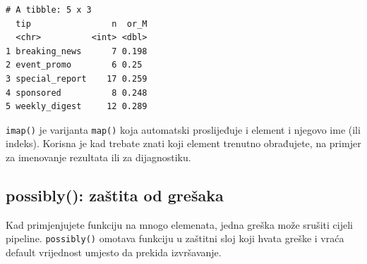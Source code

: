 \documentclass[
  croatian,
  letterpaper,
  DIV=11,
  numbers=noendperiod]{scrartcl}
\newenvironment{Shaded}{\begin{snugshade}}{\end{snugshade}}
\newcommand{\AttributeTok}[1]{\textcolor[rgb]{0.40,0.45,0.13}{#1}}
\newcommand{\CommentTok}[1]{\textcolor[rgb]{0.37,0.37,0.37}{#1}}
\newcommand{\DecValTok}[1]{\textcolor[rgb]{0.68,0.00,0.00}{#1}}
\newcommand{\FunctionTok}[1]{\textcolor[rgb]{0.28,0.35,0.67}{#1}}
\newcommand{\NormalTok}[1]{\textcolor[rgb]{0.00,0.23,0.31}{#1}}
\newcommand{\SpecialCharTok}[1]{\textcolor[rgb]{0.37,0.37,0.37}{#1}}
\begin{document}
\begin{Shaded}
\end{Shaded}

\begin{verbatim}
# A tibble: 5 x 3
  tip                n  or_M
  <chr>          <int> <dbl>
1 breaking_news      7 0.198
2 event_promo        6 0.25 
3 special_report    17 0.259
4 sponsored          8 0.248
5 weekly_digest     12 0.289
\end{verbatim}

\texttt{imap()} je varijanta \texttt{map()} koja automatski proslijeđuje
i element i njegovo ime (ili indeks). Korisna je kad trebate znati koji
element trenutno obrađujete, na primjer za imenovanje rezultata ili za
dijagnostiku.

\subsection{possibly(): zaštita od
grešaka}\label{possibly-zaux161tita-od-greux161aka}

Kad primjenjujete funkciju na mnogo elemenata, jedna greška može srušiti
cijeli pipeline. \texttt{possibly()} omotava funkciju u zaštitni sloj
koji hvata greške i vraća default vrijednost umjesto da prekida
izvršavanje.
\end{document}
